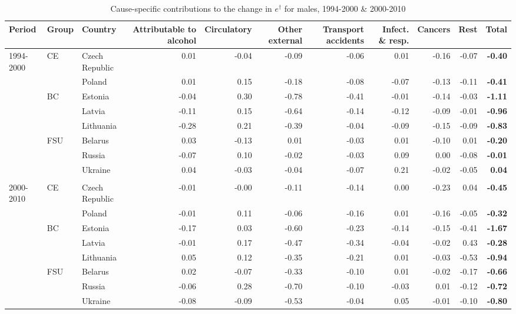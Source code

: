 \documentclass{article}
\begin{document}
\begin{landscape}
\begin{table}
\centering
\caption{Cause-specific contributions to the change in $e^\dagger$ for males, 1994-2000 \& 2000-2010}
\label{T2}
\begin{tabular}{lllrrrrrrr>{\bfseries}r}
  \hline
Period &Group& Country & Attributable to alcohol & Circulatory & Other external & Transport accidents & Infect. \& resp.  & Cancers & Rest & Total \\ 
  \hline
  \rowcolor{gray!50}
1994-2000   & CE & Czech Republic & 0.01 & -0.04 & -0.09 & -0.06 & 0.01 & -0.16 & -0.07 & -0.40 \\ 
   & & Poland & 0.01 & 0.15 & -0.18 & -0.08 & -0.07 & -0.13 & -0.11 & -0.41 \\ 
   &BC & Estonia & -0.04 & 0.30 & -0.78 & -0.41 & -0.01 & -0.14 & -0.03 & -1.11 \\ 
   & & Latvia & -0.11 & 0.15 & -0.64 & -0.14 & -0.12 & -0.09 & -0.01 & -0.96 \\ 
   & & Lithuania & -0.28 & 0.21 & -0.39 & -0.04 & -0.09 & -0.15 & -0.09 & -0.83 \\ 
   &FSU & Belarus & 0.03 & -0.13 & 0.01 & -0.03 & 0.01 & -0.10 & 0.01 & -0.20 \\ 
   & & Russia & -0.07 & 0.10 & -0.02 & -0.03 & 0.09 & 0.00 & -0.08 & -0.01 \\ 
   & & Ukraine & 0.04 & -0.03 & -0.04 & -0.07 & 0.21 & -0.02 & -0.05 & 0.04 \\
 & & & & & & & & & & \\
    \hline
      \rowcolor{gray!50}
2000-2010   &CE & Czech Republic & -0.01 & -0.00 & -0.11 & -0.14 & 0.00 & -0.23 & 0.04 & -0.45 \\ 
   & & Poland & -0.01 & 0.11 & -0.06 & -0.16 & 0.01 & -0.16 & -0.05 & -0.32 \\ 
   &BC & Estonia & -0.17 & 0.03 & -0.60 & -0.23 & -0.14 & -0.15 & -0.41 & -1.67 \\ 
   & & Latvia & -0.01 & 0.17 & -0.47 & -0.34 & -0.04 & -0.02 & 0.43 & -0.28 \\ 
   & & Lithuania & 0.05 & 0.12 & -0.35 & -0.21 & 0.01 & -0.03 & -0.53 & -0.94 \\ 
    &FSU & Belarus & 0.02 & -0.07 & -0.33 & -0.10 & 0.01 & -0.02 & -0.17 & -0.66 \\ 
   & & Russia & -0.06 & 0.28 & -0.70 & -0.10 & -0.03 & 0.01 & -0.12 & -0.72 \\ 
   & & Ukraine & -0.08 & -0.09 & -0.53 & -0.04 & 0.05 & -0.01 & -0.10 & -0.80 \\ 
   \hline
\end{tabular}

\end{table}
\end{landscape}
\end{document}
